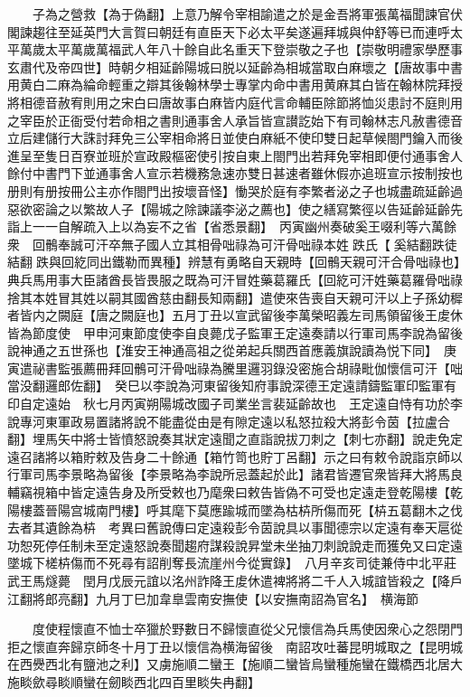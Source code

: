 　　子為之營救【為于偽翻】上意乃解令宰相諭遣之於是金吾將軍張萬福聞諫官伏閣諫趨往至延英門大言賀曰朝廷有直臣天下必太平矣遂遍拜城與仲舒等已而連呼太平萬歲太平萬歲萬福武人年八十餘自此名重天下登崇敬之子也【崇敬明禮家學歷事玄肅代及帝四世】時朝夕相延齡陽城曰脱以延齡為相城當取白麻壞之【唐故事中書用黄白二麻為綸命輕重之辯其後翰林學士專掌内命中書用黄麻其白皆在翰林院拜授將相德音赦宥則用之宋白曰唐故事白麻皆内庭代言命輔臣除節將恤災患討不庭則用之宰臣於正衙受付若命相之書則通事舍人承旨皆宣讃訖始下有司翰林志凡赦書德音立后建儲行大誅討拜免三公宰相命將日並使白麻紙不使印雙日起草候閤門鑰入而後進呈至隻日百寮並班於宣政殿樞密使引按自東上閤門出若拜免宰相即便付通事舍人餘付中書門下並通事舍人宣示若機務急速亦雙日甚速者雖休假亦追班宣示按制按也册則有册按冊公主亦作閤門出按壞音怪】慟哭於庭有李繁者泌之子也城盡疏延齡過惡欲密論之以繁故人子【陽城之除諫議李泌之薦也】使之繕寫繁徑以告延齡延齡先詣上一一自解疏入上以為妄不之省【省悉景翻】　丙寅幽州奏破奚王啜利等六萬餘衆　回鶻奉誠可汗卒無子國人立其相骨咄祿為可汗骨咄祿本姓跌氏【奚結翻跌徒結翻跌與回紇同出鐵勒而異種】辨慧有勇略自天親時【回鶻天親可汗合骨咄祿也】典兵馬用事大臣諸酋長皆畏服之既為可汗冒姓藥葛羅氏【回紇可汗姓藥葛羅骨咄祿捨其本姓冒其姓以嗣其國酋慈由翻長知兩翻】遣使來告喪自天親可汗以上子孫幼穉者皆内之闕庭【唐之闕庭也】五月丁丑以宣武留後李萬榮昭義左司馬領留後王䖍休皆為節度使　甲申河東節度使李自良薨戊子監軍王定遠奏請以行軍司馬李說為留後說神通之五世孫也【淮安王神通高祖之從弟起兵關西首應義旗說讀為悦下同】　庚寅遣祕書監張薦冊拜回鶻可汗骨咄祿為騰里邏羽錄没密施合胡祿毗伽懷信可汗【咄當没翻邏郎佐翻】　癸巳以李說為河東留後知府事說深德王定遠請鑄監軍印監軍有印自定遠始　秋七月丙寅朔陽城改國子司業坐言裴延齡故也　王定遠自恃有功於李說專河東軍政易置諸將說不能盡從由是有隙定遠以私怒拉殺大將彭令茵【拉盧合翻】埋馬矢中將士皆憤怒說奏其狀定遠聞之直詣說拔刀刺之【刺七亦翻】說走免定遠召諸將以箱貯敕及告身二十餘通【箱竹笥也貯丁呂翻】示之曰有敕令說詣京師以行軍司馬李景略為留後【李景略為李說所忌蓋起於此】諸君皆遷官衆皆拜大將馬良輔竊視箱中皆定遠告身及所受敕也乃麾衆曰敕告皆偽不可受也定遠走登乾陽樓【乾陽樓蓋晉陽宫城南門樓】呼其麾下莫應踰城而墜為枯枿所傷而死【枿五葛翻木之伐去者其遺餘為枿　考異曰舊說傳曰定遠殺彭令茵說具以事聞德宗以定遠有奉天扈從功恕死停任制未至定遠怒說奏聞趨府謀殺說昇堂未坐抽刀刺說說走而獲免又曰定遠墜城下槎枿傷而不死尋有詔削奪長流崖州今從實錄】　八月辛亥司徒兼侍中北平莊武王馬燧薨　閏月戊辰元誼以洺州詐降王䖍休遣裨將將二千人入城誼皆殺之【降戶江翻將郎亮翻】九月丁巳加韋臯雲南安撫使【以安撫南詔為官名】　横海節

　　度使程懷直不恤士卒獵於野數日不歸懷直從父兄懷信為兵馬使因衆心之怨閉門拒之懷直奔歸京師冬十月丁丑以懷信為横海留後　南詔攻吐蕃昆明城取之【昆明城在西㸑西北有鹽池之利】又虜施順二蠻王【施順二蠻皆烏蠻種施蠻在鐵橋西北居大施睒歛尋睒順蠻在劒睒西北四百里睒失冉翻】

